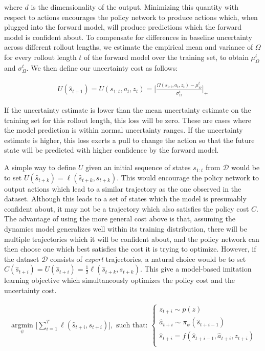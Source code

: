 \documentclass{article} %
\begin{document}
where $d$ is the dimensionality of the output. Minimizing this quantity with respect to actions encourages the policy network to produce actions which, when plugged into the forward model, will produce predictions which the forward model is confident about.
    To compensate for differences in baseline uncertainty across different rollout lengths, we estimate the empirical mean and variance of $\Omega$ for every rollout length $t$ of the forward model over the training set, to obtain $\mu_{\Omega}^t$ and $\sigma_{\Omega}^t$. We then define our uncertainty cost as follows:

    \begin{align}
      U(\hat{s}_{t+1}) = U(s_{1:t}, a_t, z_t) = \Big [ \frac{\Omega(s_{1:t}, a_t, z_t) - \mu_\Omega^t}{\sigma_\Omega^t} \Big]_+
    \end{align}

    If the uncertainty estimate is lower than the mean uncertainty estimate on the training set for this rollout length, this loss will be zero.
    These are cases where the model prediction is within normal uncertainty ranges. If the uncertainty estimate is higher, this loss exerts a pull to change the action so that the future state will be predicted with higher confidence by the forward model.



A simple way to define $U$ given an initial sequence of states $s_{1:t}$ from $\mathcal{D}$ would be to set $U(\hat{s}_{t+k}) = \ell(\hat{s}_{t+k}, s_{t+k})$.
This would encourage the policy network to output actions which lead to a similar trajectory as the one observed in the dataset.
Although this leads to a set of states which the model is presumably confident about, it may not be a trajectory which also satisfies the policy cost $\textit{C}$.
The advantage of using the more general cost above is that, assuming the dynamics model generalizes well within its training distribution, there will be multiple trajectories which it will be confident about, and the policy network can then choose one which best satisfies the cost it is trying to optimize.
However, if the dataset $\mathcal{D}$ consists of \textit{expert} trajectories, a natural choice would be to set $C(\hat{s}_{t+i}) = U(\hat{s}_{t+i}) = \frac{1}{2} \ell(\hat{s}_{t+k}, s_{t+k})$. This give a model-based imitation learning objective which simultaneously optimizes the policy cost and the uncertainty cost.


        \begin{align*}
    \underset{\psi}{\mbox{ argmin }} \Big[ \sum_{i=1}^{T} \ell(\hat{s}_{t+i}, s_{t+i}) \Big],  \mbox{ such that: }
    \begin{cases}
      z_{t+i} \sim p(z) \\
      \hat{a}_{t+i} \sim \pi_\psi(\hat{s}_{t+i-1}) \\
      \hat{s}_{t+i} = f(\hat{s}_{t+i-1}, \hat{a}_{t+i}, z_{t+i}) \\
      \end{cases}
        \end{align*}
\end{document}
